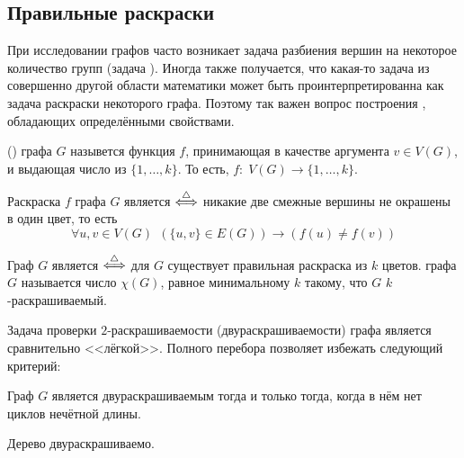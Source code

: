\subsection{Правильные раскраски}
\label{subsection:graphs:coloring}

При исследовании графов часто возникает задача разбиения вершин на некоторое количество групп (задача ).
Иногда также получается, что какая-то задача из совершенно другой области математики может быть проинтерпретированна как задача раскраски некоторого графа.
Поэтому так важен вопрос построения , обладающих определёнными свойствами. %

\begin{definition}
     () графа $ G $ назывется функция $ f $,
    принимающая в качестве аргумента $ v \in V(G) $, и выдающая число из $ \{ 1, \ldots, k \} $.
    То есть, $ f: \; V(G) \to \{1, \ldots, k \} $.
\end{definition}

\begin{definition}
    Раскраска $ f $ графа $ G $ является  $ \overset{\triangle}{\Longleftrightarrow} $ никакие две смежные вершины не окрашены в один цвет, то есть
    \[
        \forall u, v \in V(G) \;\, \left( \{u, v\} \in E(G) \right) \rightarrow \left( f(u) \neq f(v) \right)
    \]
\end{definition}

\begin{definition}
    Граф $ G $ является  $ \overset{\triangle}{\Longleftrightarrow} $ для $ G $ существует правильная раскраска из $ k $ цветов.
    \newline
     графа $ G $ называется число $ \chi(G) $, равное минимальному $ k $ такому, что $ G $ $ k $-раскрашиваемый.
\end{definition}

Задача проверки $ 2 $-раскрашиваемости (двураскрашиваемости) графа является сравнительно <<лёгкой>>.
Полного перебора позволяет избежать следующий критерий:
\begin{theorem}
    Граф $ G $ является двураскрашиваемым тогда и только тогда, когда в нём нет циклов нечётной длины.
\end{theorem}

\begin{corollary}
    Дерево двураскрашиваемо.
\end{corollary}

